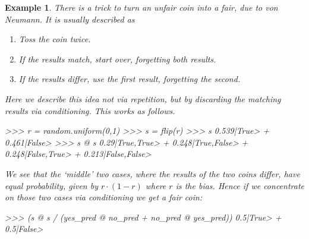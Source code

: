 \documentclass[leqno]{tufte-book} %
\newtheorem{example}[theorem]{Example}
\begin{document}
\begin{example}
\label{ex:vonneumancoin}
There is a trick to turn an unfair coin into a fair, due to von
Neumann. It is usually described
as
\begin{enumerate}
\item Toss the coin twice.
\item If the results match, start over, forgetting both results.
\item If the results differ, use the first result, forgetting the second.
\end{enumerate}

\noindent Here we describe this idea not via repetition, but by
discarding the matching results via conditioning. This works as
follows.
\begin{python}
>>> r = random.uniform(0,1)
>>> s = flip(r)
>>> s
0.539|True> + 0.461|False>
>>> s @ s
0.29|True,True> + 0.248|True,False> + 0.248|False,True> + 0.213|False,False>
\end{python}

\noindent We see that the `middle' two cases, where the results of the
two coins differ, have equal probability, given by $r \cdot (1-r)$
where $r$ is the bias. Hence if we concentrate on those two cases via
conditioning we get a fair coin:
\begin{python}
>>> (s @ s / (yes_pred @ no_pred + no_pred @ yes_pred)) %
0.5|True> + 0.5|False>
\end{python}
\end{example}
\end{document}
